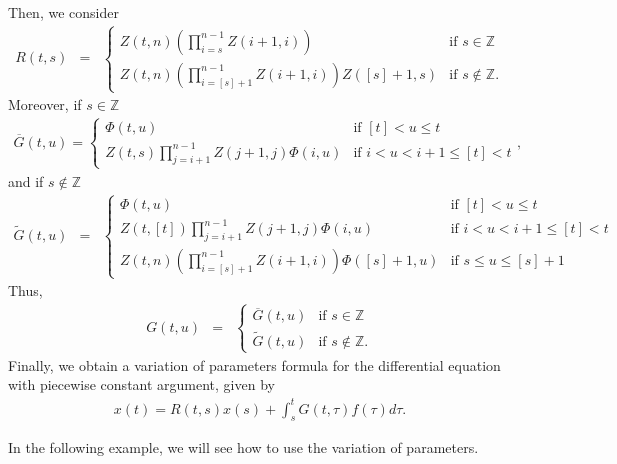 \documentclass[english,,reqno]{amsart}
\numberwithin{equation}{section}
\newcommand{\bb}[1]{\mathbb{#1}}
\theoremstyle{plain}
\theoremstyle{definition}
\theoremstyle{remark}
\begin{document}
Then, we consider
\begin{eqnarray}
R(t,s)&=&\begin{cases}
Z(t,n)\left(\displaystyle{\prod_{i=s}^{n-1}}Z(i+1,i)\right) & \mbox{if }s\in\mathbb{Z}\\
Z(t,n)\left(\displaystyle{\prod_{i=[s]+1}^{n-1}}Z(i+1,i)\right)Z([s]+1,s) & \mbox{if }s\notin\mathbb{Z}.
\end{cases}\label{R_depca}
\end{eqnarray}
Moreover, if $s\in\bb{Z}$
\begin{eqnarray*}
\overline{G}(t,u)=\begin{cases}
\Phi(t,u) & \mbox{if }[t]<u\leq t\\
Z(t,s)\displaystyle{\prod_{j=i+1}^{n-1}}Z(j+1,j)\Phi(i,u) & \mbox{if }i<u<i+1\leq[t]<t
\end{cases}, 
\end{eqnarray*}
and if $s\notin\bb{Z}$
\begin{eqnarray*}
\tilde{G}(t,u)&=&\begin{cases}
\Phi(t,u) & \mbox{if }[t]<u\leq t\\
Z(t,[t])\displaystyle{\prod_{j=i+1}^{n-1}}Z(j+1,j)\Phi(i,u) & \mbox{if }i<u<i+1\leq[t]<t\\
Z(t,n)\left(\displaystyle{\prod_{i=[s]+1}^{n-1}}Z(i+1,i)\right)\Phi([s]+1,u) & \mbox{if }s\leq u\leq[s]+1
\end{cases}
\end{eqnarray*}
Thus,
\begin{eqnarray}
G(t,u)&=&\begin{cases}
\overline{G}(t,u) & \mbox{if }s\in\mathbb{Z}\\
\widetilde{G}(t,u) & \mbox{if }s\notin\mathbb{Z}.
\end{cases}\label{varpar_G}
\end{eqnarray}
Finally, we obtain a variation of parameters formula for the differential equation with piecewise constant argument, given by
\begin{eqnarray*}
x(t)=R(t,s)x(s)+\int_{s}^{t} G(t,\tau)f(\tau)d\tau.
\end{eqnarray*}

In the following example, we will see how to use the variation of parameters.
\end{document}

